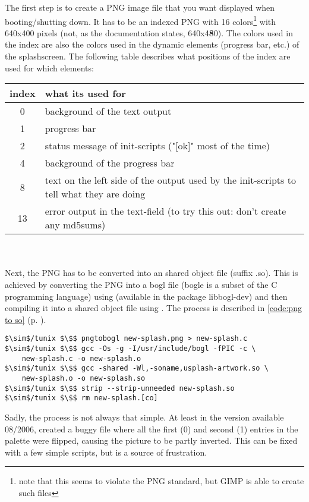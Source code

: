 The first step is to create a PNG image file that you want displayed when
booting/shutting down. It has to be an indexed PNG with 16 colors\footnote{note
that this seems to violate the PNG standard, but GIMP is able to create such
files} with 640x400 pixels (not, as the documentation states, 640x4\textbf{8}0).
The colors used in the index are also the colors used in the dynamic elements
(progress bar, etc.) of the splashscreen. The following table describes what
positions of the index are used for which elements:\\

\begin{tabular}[ht]{|c|p{11cm}|}
\hline
\textbf{index} & \textbf{what its used for} \\ \hline
0 & background of the text output \\ \hline
1 & progress bar \\ \hline
2 & status message of init-scripts ("[ok]" most of the time) \\ \hline
4 & background of the progress bar \\ \hline
8 & text on the left side of the output used by the init-scripts to tell what
they are doing \\ \hline
13 & error output in the text-field (to try this out: don't create any md5sums)
\\ \hline
\end{tabular}\\\\

Next, the PNG has to be converted into an shared object file (suffix .so). This
is achieved by converting the PNG into a bogl file (bogle is a subset of the C
programming language) using  (available in the package
libbogl-dev) and then compiling it into a shared object file using .
The process is described in \lstlistingname{} \ref{code:png to so} (p.
\pageref{code:png to so}).
\begin{lstlisting}[float=ht,label=code:png to so,caption=Converting a PNG to a
shared object]
$\sim$/tunix $\$$ pngtobogl new-splash.png > new-splash.c 
$\sim$/tunix $\$$ gcc -Os -g -I/usr/include/bogl -fPIC -c \
	new-splash.c -o new-splash.o
$\sim$/tunix $\$$ gcc -shared -Wl,-soname,usplash-artwork.so \
	new-splash.o -o new-splash.so
$\sim$/tunix $\$$ strip --strip-unneeded new-splash.so
$\sim$/tunix $\$$ rm new-splash.[co]
\end{lstlisting}

Sadly, the process is not always that simple. At least in the version available
08/2006,  created a buggy file where all the first (0) and second
(1) entries in the palette were flipped, causing the picture to be partly inverted.
This can be fixed with a few simple \cmd{sed} scripts, but is a source of
frustration.

